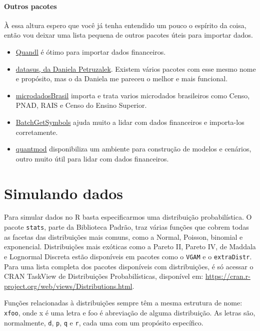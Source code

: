 \documentclass[]{article}
\providecommand{\tightlist}{%
  \setlength{\itemsep}{0pt}\setlength{\parskip}{0pt}}
\let\oldparagraph\paragraph
\renewcommand{\paragraph}[1]{\oldparagraph{#1}\mbox{}}
\begin{document}
\paragraph{Outros pacotes}\label{outros-pacotes}

À essa altura espero que você já tenha entendido um pouco o espírito da
coisa, então vou deixar uma lista pequena de outros pacotes úteis para
importar dados.

\begin{itemize}
\tightlist
\item
  \href{https://www.quandl.com/tools/r}{Quandl} é ótimo para importar
  dados financeiros.
\item
  \href{https://github.com/danicat/datasus}{datasus, da Daniela
  Petruzalek}. Existem vários pacotes com esse mesmo nome e propósito,
  mas o da Daniela me pareceu o melhor e mais funcional.
\item
  \href{https://github.com/lucasmation/microdadosBrasil}{microdadosBrasil}
  importa e trata varios microdados brasileiros como Censo, PNAD, RAIS e
  Censo do Ensino Superior.
\item
  \href{https://cran.r-project.org/web/packages/BatchGetSymbols/BatchGetSymbols.pdf}{BatchGetSymbols}
  ajuda muito a lidar com dados financeiros e importa-los corretamente.
\item
  \href{https://www.quantmod.com/}{quantmod} disponibiliza um ambiente
  para construção de modelos e cenários, outro muito útil para lidar com
  dados financeiros.
\end{itemize}

\section{Simulando dados}\label{simulando-dados}

Para simular dados no R basta especificarmos uma distribuição
probabilística. O pacote \texttt{stats}, parte da Biblioteca Padrão,
traz várias funções que cobrem todas as facetas das distribuições mais
comuns, como a Normal, Poisson, binomial e exponencial. Distribuições
mais exóticas como a Pareto II, Pareto IV, de Maddala e Lognormal
Discreta estão disponíveis em pacotes como o \texttt{VGAM} e o
\texttt{extraDistr}. Para uma lista completa dos pacotes disponíveis com
distribuições, é só acessar o CRAN TaskView de Distribuições
Probabilísticas, disponível em:
\url{https://cran.r-project.org/web/views/Distributions.html}.

Funções relacionadas à distribuições sempre têm a mesma estrutura de
nome: \texttt{xfoo}, onde x é uma letra e foo é abreviação de alguma
distribuição. As letras são, normalmente, \texttt{d}, \texttt{p},
\texttt{q} e \texttt{r}, cada uma com um propósito específico.
\end{document}
